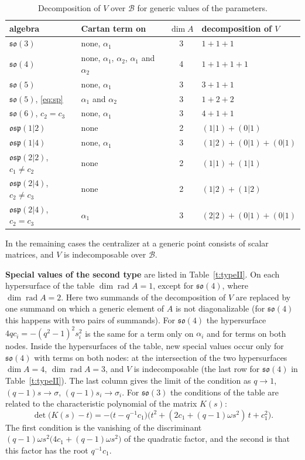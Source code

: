 \documentclass[12pt,a4paper]{article}
\newcommand{\so}{\mathfrak{so}}
\newcommand{\osp}{\mathfrak{osp}}
\begin{document}
\begin{table}[H]
\centering\small
\begin{tabular}{@{}llcl@{}}
\toprule
algebra & Cartan term on & $\dim A$ & decomposition of $V$\\
\midrule
$\so(3)$ & none, $\alpha_1$ & 3 & $1+1+1$\\
$\so(4)$ & none, $\alpha_1$, $\alpha_2$, $\alpha_1$ and $\alpha_2$ & 4 & $1+1+1+1$\\
$\so(5)$ & none, $\alpha_1$ & 3 & $3+1+1$\\
$\so(5)$, \eqref{eq:sp} & $\alpha_1$ and $\alpha_2$ & 3 & $1+2+2$\\
$\so(6)$, $c_2=c_3$ & none, $\alpha_1$ & 3 & $4+1+1$\\
$\osp(1|2)$ & none & 2 & $(1|1)+(0|1)$\\
$\osp(1|4)$ & none, $\alpha_1$ & 3 & $(1|2)+(0|1)+(0|1)$\\
$\osp(2|2)$, $c_1\neq c_2$ & none & 2 & $(1|1)+(1|1)$\\
$\osp(2|4)$, $c_2\neq c_3$ & none & 2 & $(1|2)+(1|2)$\\
$\osp(2|4)$, $c_2=c_3$ & $\alpha_1$ & 3 & $(2|2)+(0|1)+(0|1)$\\
\bottomrule
\end{tabular}
\caption{Decomposition of $V$ over $\mathcal B$ for generic values of the parameters.}\label{t:dec}
\end{table}

In the remaining cases the centralizer at a generic point consists of scalar matrices, and $V$ is indecomposable over $\mathcal B$.

\textbf{Special values of the second type} are listed in Table~\ref{t:typeII}. On each hypersurface of the table
$\dim\operatorname{rad}A=1$, except for $\so(4)$, where $\dim\operatorname{rad}A=2$. Here two summands of the decomposition of $V$
are replaced by one summand on which a generic element of $A$ is not diagonalizable (for $\so(4)$ this happens with two
pairs of summands). For $\so(4)$ the hypersurface $4qc_i=-(q^2-1)^2s_i^2$ is the same for a term only on $\alpha_i$
and for terms on both nodes. Inside the hypersurfaces of the table, new special values occur only for $\so(4)$ with
terms on both nodes: at the intersection of the two hypersurfaces $\dim A=4$, $\dim\operatorname{rad}A=3$, and $V$
is indecomposable (the last row for $\so(4)$ in Table~\ref{t:typeII}). The last
column gives the limit of the condition as $q\to1$, $(q-1)s\to\sigma$, $(q-1)s_i\to\sigma_i$. For
$\so(3)$ the conditions of the table are related to the characteristic polynomial of the matrix $K(s)$:
\[
\det\bigl(K(s)-t\bigr)=-\bigl(t-q^{-1}c_1\bigr)\bigl(t^2+(2c_1+(q-1)\omega s^2)\,t+c_1^2\bigr).
\]
The first condition is the vanishing of the discriminant $(q-1)\omega s^2\bigl(4c_1+(q-1)\omega s^2\bigr)$
of the quadratic factor, and the second is that this factor has the root $q^{-1}c_1$.
\end{document}
